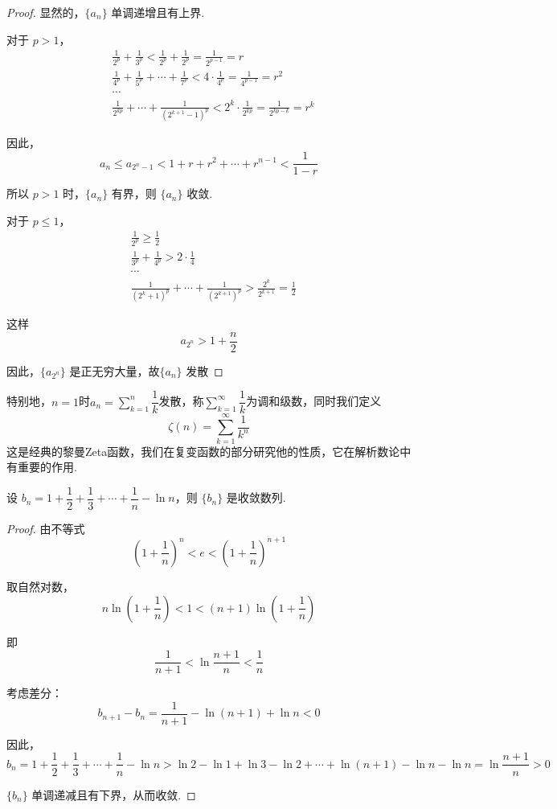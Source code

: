\begin{proof}
	显然的，$\{a_n\}$ 单调递增且有上界.
	
	对于 $p > 1$，
	$$\begin{aligned}
		&\frac{1}{2^p} + \frac{1}{3^p} < \frac{1}{2^{p}} + \frac{1}{2^{p}} = \frac{1}{2^{p-1}} = r\\
		&\frac{1}{4^p} + \frac{1}{5^p} + \cdots + \frac{1}{7^p} < 4 \cdot \frac{1}{4^p} = \frac{1}{4^{p-1}} = r^2\\
		&\cdots\\
		&\frac{1}{2^{kp}} + \cdots + \frac{1}{(2^{k+1}-1)^p} < 2^k \cdot \frac{1}{2^{kp}} = \frac{1}{2^{kp-k}} = r^k
	\end{aligned}$$
	
	
	因此，
	\[
	a_n \leqslant a_{2^n-1} < 1 + r + r^2 + \cdots + r^{n-1} < \frac{1}{1-r}
	\]
	
	所以 $p > 1$ 时，$\{a_n\}$ 有界，则 $\{a_n\}$ 收敛.
	
	对于 $p \leqslant 1$，
	$$\begin{aligned}
		&\frac{1}{2^p}  \geqslant \frac{1}{2} \\
		&\frac{1}{3^p}+\frac{1}{4^p}  > 2\cdot\frac{1}{4}\\
		&\cdots\\
		&\frac{1}{(2^{k}+1)^{p}} + \cdots + \frac{1}{(2^{k+1})^{p}} > \frac{2^{k}}{2^{k+1}} = \frac{1}{2}
	\end{aligned}$$
	
	这样$$a_{2^n}>1+\frac{n}{2}$$
	
	因此，$\{a_{2^n}\}$ 是正无穷大量，故$\{a_n\}$ 发散
	
	
\end{proof}
特别地，$n=1$时$a_n=\sum\limits_{k=1}^n\dfrac{1}{k}$发散，称$\sum\limits_{k=1}^{\infty}\dfrac{1}{k}$为调和级数，同时我们定义$$\zeta(n)=\sum\limits_{k=1}^{\infty}\dfrac{1}{k^n}$$这是经典的黎曼Zeta函数，我们在复变函数的部分研究他的性质，它在解析数论中有重要的作用.
\begin{proposition}
	设 $b_n = 1 + \dfrac{1}{2} + \dfrac{1}{3} + \cdots + \dfrac{1}{n} - \ln n$，则 $\{b_n\}$ 是收敛数列.
	\label{defofeucon}
\end{proposition}
\begin{proof}
	由不等式
	\[
	\left(1 + \frac{1}{n}\right)^n < e < \left(1 + \frac{1}{n}\right)^{n+1}
	\]
	
	取自然对数，
	\[
	n \ln \left(1 + \frac{1}{n}\right) < 1 < (n+1) \ln \left(1 + \frac{1}{n}\right)
	\]
	
	即
	\[
	\frac{1}{n+1} < \ln \frac{n+1}{n} < \frac{1}{n}
	\]
	
	考虑差分：
	\[
	b_{n+1} - b_n = \frac{1}{n+1} - \ln(n+1) + \ln n < 0
	\]
	
	因此，
	\[
	b_n = 1 + \frac{1}{2} + \frac{1}{3} + \cdots + \frac{1}{n} - \ln n >\ln2-\ln1+\ln3-\ln2+\cdots+\ln(n+1)-\ln n-\ln n= \ln \frac{n+1}{n} > 0
	\]
	
	$\{b_n\}$ 单调递减且有下界，从而收敛.
\end{proof}
